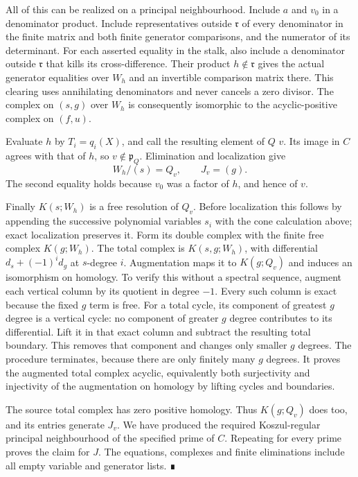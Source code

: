 \documentclass[11pt,a4paper,openany]{report}
\begin{document}
All of this can be realized on a principal neighbourhood. Include \(a\) and \(v_0\) in a denominator product. Include representatives outside \(\mathfrak r\) of every denominator in the finite matrix and both finite generator comparisons, and the numerator of its determinant. For each asserted equality in the stalk, also include a denominator outside \(\mathfrak r\) that kills its cross-difference. Their product \(h\notin\mathfrak r\) gives the actual generator equalities over \(W_h\) and an invertible comparison matrix there. This clearing uses annihilating denominators and never cancels a zero divisor. The complex on \((s,g)\) over \(W_h\) is consequently isomorphic to the acyclic-positive complex on \((f,u)\).

Evaluate \(h\) by \(T_i=q_i(X)\), and call the resulting element of \(Q\) \(v\). Its image in \(C\) agrees with that of \(h\), so \(v\notin\mathfrak p_Q\). Elimination and localization give \[W_h/(s)=Q_v,\qquad J_v=(g).\] The second equality holds because \(v_0\) was a factor of \(h\), and hence of \(v\).

Finally \(K(s;W_h)\) is a free resolution of \(Q_v\). Before localization this follows by appending the successive polynomial variables \(s_i\) with the cone calculation above; exact localization preserves it. Form its double complex with the finite free complex \(K(g;W_h)\). The total complex is \(K(s,g;W_h)\), with differential \(d_s+(-1)^i d_g\) at \(s\)-degree \(i\). Augmentation maps it to \(K(g;Q_v)\) and induces an isomorphism on homology. To verify this without a spectral sequence, augment each vertical column by its quotient in degree \(-1\). Every such column is exact because the fixed \(g\) term is free. For a total cycle, its component of greatest \(g\) degree is a vertical cycle: no component of greater \(g\) degree contributes to its differential. Lift it in that exact column and subtract the resulting total boundary. This removes that component and changes only smaller \(g\) degrees. The procedure terminates, because there are only finitely many \(g\) degrees. It proves the augmented total complex acyclic, equivalently both surjectivity and injectivity of the augmentation on homology by lifting cycles and boundaries.

The source total complex has zero positive homology. Thus \(K(g;Q_v)\) does too, and its entries generate \(J_v\). We have produced the required Koszul-regular principal neighbourhood of the specified prime of \(C\). Repeating for every prime proves the claim for \(J\). The equations, complexes and finite eliminations include all empty variable and generator lists. ∎
\end{document}
